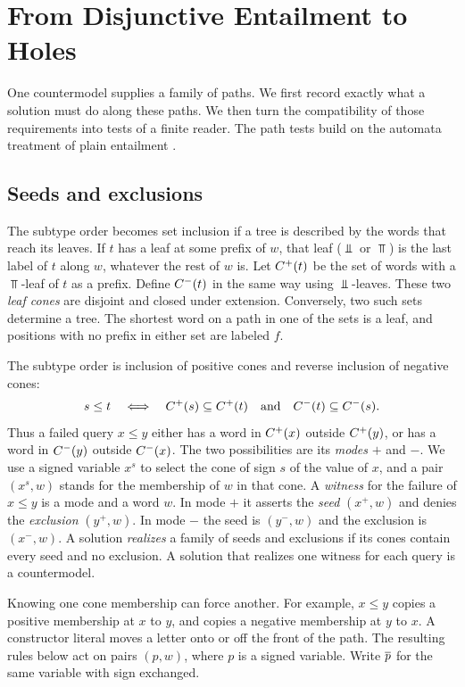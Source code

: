 \section{From Disjunctive Entailment to Holes}
\label{sec:readers}

One countermodel supplies a family of paths. We first record exactly what a
solution must do along these paths. We then turn the compatibility of those
requirements into tests of a finite reader. The path tests build on the
automata treatment of plain entailment
\cite{NiehrenPriesnitz03,NSSE26}.

\subsection{Seeds and exclusions}

The subtype order becomes set inclusion if a tree is described by the words
that reach its leaves. If $t$ has a leaf at some prefix of $w$, that leaf
($\Bot$ or $\Top$) is the last label of $t$ along $w$, whatever the rest of
$w$ is. Let $C^{+}(t)$ be the set of words with a $\Top$-leaf of $t$ as a
prefix. Define $C^{-}(t)$ in the same way using $\Bot$-leaves. These two
\emph{leaf cones} are disjoint and closed under extension. Conversely, two
such sets determine a tree. The shortest word on a path in one of the sets
is a leaf, and positions with no prefix in either set are labeled $f$.

The subtype order is inclusion of positive cones and reverse inclusion of
negative cones:
\[
  s\le t \quad\Longleftrightarrow\quad
  C^{+}(s)\subseteq C^{+}(t)
  \quad\text{and}\quad
  C^{-}(t)\subseteq C^{-}(s).
\]
Thus a failed query $x\le y$ either has a word in $C^{+}(x)$
outside $C^{+}(y)$, or has a word in $C^{-}(y)$ outside
$C^{-}(x)$. The two possibilities are its \emph{modes} $+$ and $-$.
We use a signed variable $x^s$ to select the cone of sign $s$ of the value
of $x$, and a pair $(x^s,w)$ stands for the membership of $w$ in that cone.
A \emph{witness} for the failure of $x\le y$ is a mode and a word $w$. In
mode $+$ it asserts the \emph{seed} $(x^+,w)$ and denies the
\emph{exclusion} $(y^+,w)$. In mode $-$ the seed is $(y^-,w)$ and the
exclusion is $(x^-,w)$. A solution \emph{realizes} a family of seeds and
exclusions if its cones contain every seed and no exclusion. A solution
that realizes one witness for each query is a countermodel.

Knowing one cone membership can force another. For example, $x\le y$
copies a positive membership at $x$ to $y$, and copies a negative membership
at $y$ to $x$. A constructor literal moves a letter onto or off the front of
the path. The resulting rules below act on pairs $(p,w)$, where $p$ is a
signed variable. Write $\overline{p}$ for the same variable with sign exchanged.

